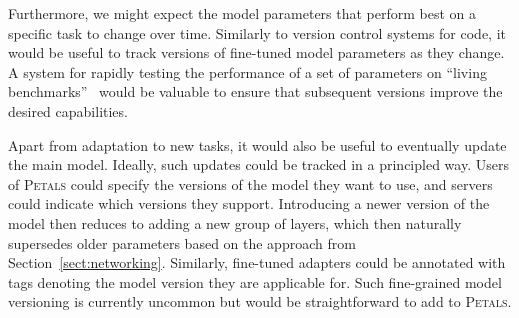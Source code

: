 
Furthermore, we might expect the model parameters that perform best on a specific task to change over time.
Similarly to version control systems for code, it would be useful to track versions of fine-tuned model parameters as they change.
A system for rapidly testing the performance of a set of parameters on ``living benchmarks''~\citep{dynabench,gehrmann2022gemv2,eval-harness} would be valuable to ensure that subsequent versions improve the desired capabilities.

Apart from adaptation to new tasks, it would also be useful to eventually update the main model.
Ideally, such updates could be tracked in a principled way.
Users of \textsc{Petals} could specify the versions of the model they want to use, and servers could indicate which versions they support.
Introducing a newer version of the model then reduces to adding a new group of layers, which then naturally supersedes older parameters based on the approach from Section~\ref{sect:networking}.
Similarly, fine-tuned adapters could be annotated with tags denoting the model version they are applicable for.
Such fine-grained model versioning is currently uncommon but would be straightforward to add to \textsc{Petals}.
